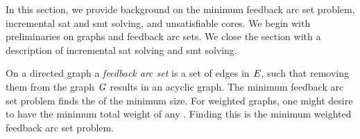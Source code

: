 \label{section:background}

In this section, we provide background on the minimum feedback arc set problem,
incremental \ac{sat} and \ac{smt} solving, and unsatisfiable cores. We begin
with preliminaries on graphs and feedback arc sets. We close the section with a
description of incremental \ac{sat} solving and \ac{smt} solving.

On a directed graph  a \emph{feedback arc set}  is a set
of edges in $\mathit{E}$, such that removing them from the graph $\mathit{G}$ results in
an acyclic graph. The minimum feedback arc set problem finds the
 of the minimum size. For weighted graphs, one might desire
 to have the minimum total weight of any . Finding this
 is the minimum weighted feedback arc set problem.




